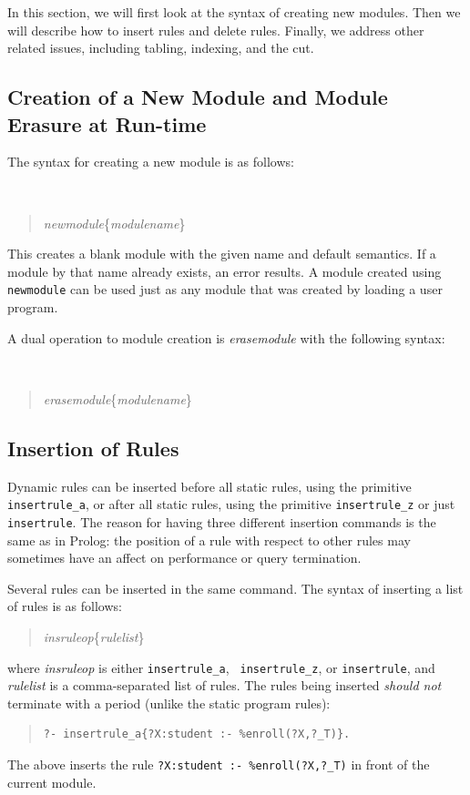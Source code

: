 \documentclass[11pt]{article}
\begin{document}
In this section, we will first look at the syntax of creating new
modules.  Then we will describe how to insert rules and delete
rules. Finally, we address other related issues, including tabling,
indexing, and the cut.


\subsection{Creation of a New Module and Module Erasure at Run-time}


The syntax for creating a new module is as follows:
{\tt
\begin{quote}
\emph{newmodule}\{\emph{modulename}\}
\end{quote}
}
\noindent
This creates a blank module with the given name and default semantics.  If
a module by that name already exists, an error results.  A module created
using {\tt newmodule} can be used just as any module that
was created by loading a user program.

A dual operation to module creation
is \emph{erasemodule} with the following syntax:
{\tt
\begin{quote}
\emph{erasemodule}\{\emph{modulename}\}
\end{quote}
}


\subsection{Insertion of Rules}
\label{sec-insertingrule}

Dynamic rules can be inserted before all static rules, using the
primitive {\tt insertrule\_a}, or after all static rules, using the
primitive {\tt insertrule\_z} or just {\tt insertrule}.
The reason for having three different insertion commands is the same as in
Prolog: the position of a rule with respect to other rules
may sometimes have an affect on
performance or query termination.

Several rules
can be inserted in the same command. The syntax of inserting a list of
rules is as follows:
\begin{quote}
\emph{insruleop}\{\emph{rulelist}\}
\end{quote}
\noindent
where \emph{insruleop} is either {\tt insertrule\_a}, {\tt
  insertrule\_z}, or {\tt insertrule},  and \emph{rulelist}  is a comma-separated
  list of rules.  The rules being inserted \emph{should not} terminate
  with a period (unlike the static program rules):
\begin{quote}
\begin{verbatim}
?- insertrule_a{?X:student :- %enroll(?X,?_T)}.
\end{verbatim}
\end{quote}
The above inserts the rule {\tt ?X:student :- \verb|%|enroll(?X,?\_T)} in
front of the current module.
\end{document}
